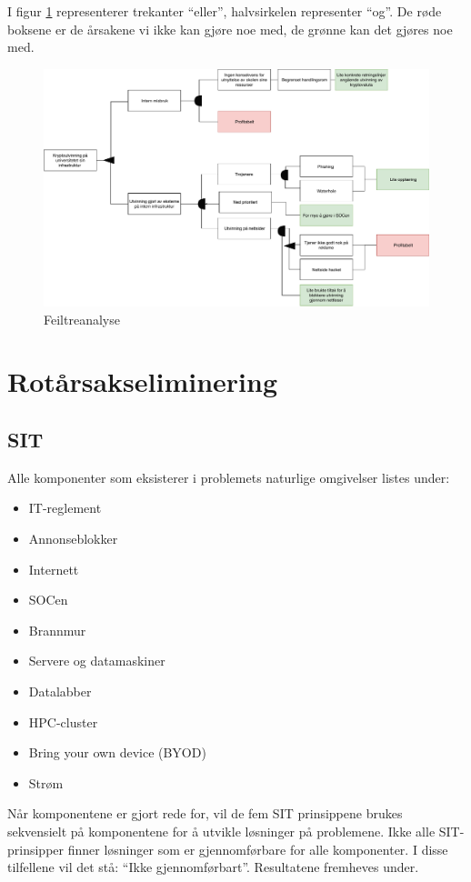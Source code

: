 I figur \ref{fig:feil_tre_analyse} representerer trekanter ``eller'', halvsirkelen representer ``og''. De røde boksene er de årsakene vi ikke kan gjøre noe med, de grønne kan det gjøres noe med.
 \begin{figure}[H]
    \centering
    \includegraphics[scale=0.45]{case_3/bilder/feil_tre_analyse.pdf}
    \caption{Feiltreanalyse}
    \label{fig:feil_tre_analyse}
\end{figure}
\section{Rotårsakseliminering}
\subsection{SIT}
Alle komponenter som eksisterer i problemets naturlige omgivelser listes under:

\begin{itemize}
    \item IT-reglement
    \item Annonseblokker
    \item Internett
    \item SOCen
    \item Brannmur
    \item Servere og datamaskiner
    \item Datalabber
    \item HPC-cluster
    \item Bring your own device (BYOD)
    \item Strøm
\end{itemize}

Når komponentene er gjort rede for, vil de fem SIT prinsippene brukes sekvensielt på komponentene for å utvikle løsninger på problemene. Ikke alle SIT-prinsipper finner løsninger som er gjennomførbare for alle komponenter. I disse tilfellene vil det stå: ``Ikke gjennomførbart''. Resultatene fremheves under.

